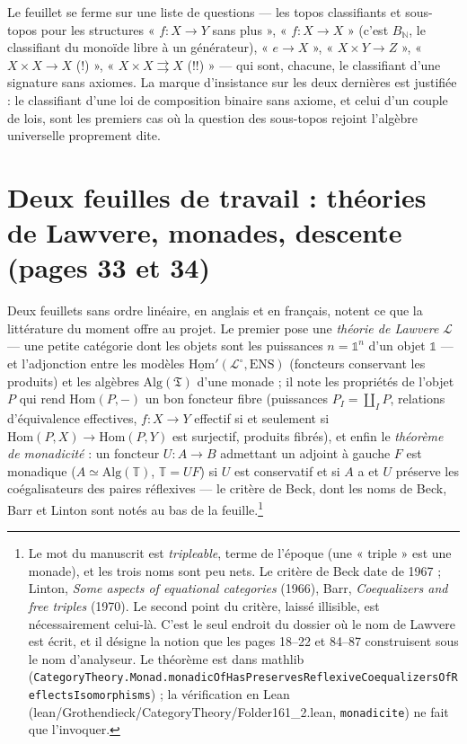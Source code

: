 \documentclass[11pt,a4paper]{article}
\begin{document}
Le feuillet se ferme sur une liste de questions — les topos classifiants
et sous-topos pour les structures « $f : X \to Y$ sans plus », « $f : X \to
X$ » (c'est $B_{\mathbb{N}}$, le classifiant du monoïde libre à un
générateur), « $e \to X$ », « $X \times Y \to Z$ », « $X \times X \to X$
(!) », « $X \times X \rightrightarrows X$ (!!) » — qui sont, chacune, le
classifiant d'une signature sans axiomes. La marque d'insistance sur les
deux dernières est justifiée : le classifiant d'une loi de composition
binaire sans axiome, et celui d'un couple de lois, sont les premiers cas où
la question des sous-topos rejoint l'algèbre universelle proprement dite.

\section*{Deux feuilles de travail : théories de Lawvere, monades, descente (pages 33 et 34)}

Deux feuillets sans ordre linéaire, en anglais et en français, notent ce
que la littérature du moment offre au projet. Le premier pose une
\emph{théorie de Lawvere} $\mathcal{L}$ — une petite catégorie dont les
objets sont les puissances $n = \mathbb{1}^{n}$ d'un objet $\mathbb{1}$ —
et l'adjonction entre les modèles $\underline{\mathrm{Hom}}'(\mathcal{L}^{\circ},
\mathrm{ENS})$ (foncteurs conservant les produits) et les algèbres
$\mathrm{Alg}(\mathfrak{T})$ d'une monade ; il note les propriétés de
l'objet $P$ qui rend $\mathrm{Hom}(P, -)$ un bon foncteur fibre (puissances
$P_{I} = \coprod_{I} P$, relations d'équivalence effectives, $f : X \to Y$
effectif si et seulement si $\mathrm{Hom}(P, X) \to \mathrm{Hom}(P, Y)$
est surjectif, produits fibrés), et enfin le \emph{théorème de
monadicité} : un foncteur $U : A \to B$ admettant un adjoint à gauche $F$
est monadique ($A \simeq \mathrm{Alg}(\mathbb{T})$, $\mathbb{T} = UF$) si
$U$ est conservatif et si $A$ a et $U$ préserve les coégalisateurs des
paires réflexives — le critère de Beck, dont les noms de Beck, Barr et
Linton sont notés au bas de la feuille.\footnote{Le mot du manuscrit est
\emph{tripleable}, terme de l'époque (une « triple » est une monade), et
les trois noms sont peu nets. Le critère de Beck date de 1967 ; Linton,
\emph{Some aspects of equational categories} (1966), Barr, \emph{Coequalizers
and free triples} (1970). Le second point du critère, laissé illisible,
est nécessairement celui-là. C'est le seul endroit du dossier où le nom de
Lawvere est écrit, et il désigne la notion que les pages 18--22 et 84--87
construisent sous le nom d'analyseur. Le théorème est dans mathlib
(\texttt{CategoryTheory.Monad.monadicOfHasPreservesReflexiveCoequalizersOfReflectsIsomorphisms}) ;
la vérification en Lean (lean/Grothendieck/CategoryTheory/Folder161\_2.lean,
\texttt{monadicite}) ne fait que l'invoquer.}
\end{document}
